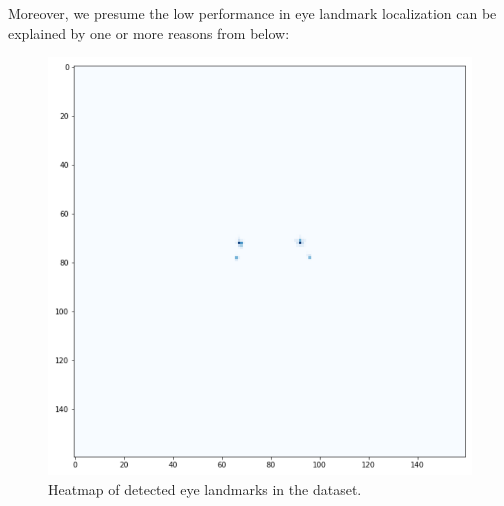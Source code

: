 Moreover, we presume the low performance in eye landmark localization can be explained by one or more reasons from below:

\begin{figure}[h]
\centering
\includegraphics[width=0.6\linewidth]{images/eyes/heatmap_eyes_v0.914.png}
\caption{Heatmap of detected eye landmarks in the \adhoc dataset.}
\label{fig:heatmap_eyes}
\end{figure}

